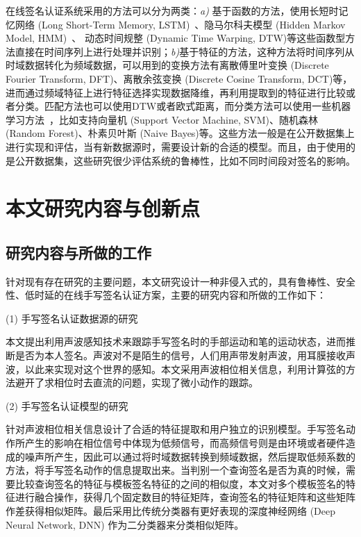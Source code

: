 在线签名认证系统采用的方法可以分为两类：\textit{a)} 基于函数的方法，使用长短时记忆网络 (Long Short-Term Memory, LSTM)~\cite{hochreiter1997long}、隐马尔科夫模型 (Hidden Markov Model, HMM)~\cite{rabiner1986introduction}、 动态时间规整 (Dynamic Time Warping, DTW)等这些函数型方法直接在时间序列上进行处理并识别；\textit{b)}基于特征的方法，这种方法将时间序列从时域数据转化为频域数据，可以用到的变换方法有离散傅里叶变换 (Discrete Fourier Transform, DFT)、离散余弦变换 (Discrete Cosine Transform, DCT)等，进而通过频域特征上进行特征选择实现数据降维，再利用提取到的特征进行比较或者分类。匹配方法也可以使用DTW或者欧式距离，而分类方法可以使用一些机器学习方法~\cite{周志华2016机器学习}，比如支持向量机 (Support Vector Machine, SVM)、随机森林 (Random Forest)、朴素贝叶斯 (Naive Bayes)等。这些方法一般是在公开数据集上进行实现和评估，当有新数据源时，需要设计新的合适的模型。而且，由于使用的是公开数据集，这些研究很少评估系统的鲁棒性，比如不同时间段对签名的影响。

\section{本文研究内容与创新点}
\subsection{研究内容与所做的工作}
针对现有存在研究的主要问题，本文研究设计一种非侵入式的，具有鲁棒性、安全性、低时延的在线手写签名认证方案，主要的研究内容和所做的工作如下：

(1) 手写签名认证数据源的研究

本文提出利用声波感知技术来跟踪手写签名时的手部运动和笔的运动状态，进而推断是否为本人签名。声波对不是陌生的信号，人们用声带发射声波，用耳膜接收声波，以此来实现对这个世界的感知。本文采用声波相位相关信息，利用计算弦的方法避开了求相位时去直流的问题，实现了微小动作的跟踪。


(2) 手写签名认证模型的研究

针对声波相位相关信息设计了合适的特征提取和用户独立的识别模型。手写签名动作所产生的影响在相位信号中体现为低频信号，而高频信号则是由环境或者硬件造成的噪声所产生，因此可以通过将时域数据转换到频域数据，然后提取低频系数的方法，将手写签名动作的信息提取出来。当判别一个查询签名是否为真的时候，需要比较查询签名的特征与模板签名特征的之间的相似度，本文对多个模板签名的特征进行融合操作，获得几个固定数目的特征矩阵，查询签名的特征矩阵和这些矩阵作差获得相似矩阵。最后采用比传统分类器有更好表现的深度神经网络 (Deep Neural Network, DNN)\cite{Schmidhuber2015Deep} 作为二分类器来分类相似矩阵。

